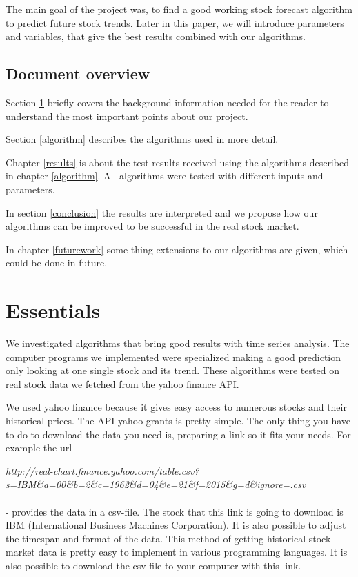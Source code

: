 \documentclass[conference]{IEEEtran}
\begin{document}
The main goal of the project was, to find a good working stock forecast algorithm to predict future stock trends. Later in this paper, we will introduce parameters and variables, that give the best results combined with our algorithms.

\subsection{Document overview}
Section \ref{essentials} briefly covers the background information needed for the reader to understand the most important points about our project.

Section \ref{algorithm} describes the algorithms used in more detail. 

Chapter \ref{results} is about the test-results received using the algorithms described in chapter \ref{algorithm}. All algorithms were tested with different inputs and parameters.

In section \ref{conclusion} the results are interpreted and we propose how our algorithms can be improved to be successful in the real stock market.

In chapter \ref{futurework} some thing extensions to our algorithms are given, which could be done in future.


\section{Essentials}
\label{essentials}

We investigated algorithms that bring good results with time series analysis. The computer programs we implemented were specialized  making a good prediction only looking at one single stock and its trend. These algorithms were tested on real stock data we fetched from the yahoo finance API. 

We used yahoo finance because it gives easy access to numerous stocks and their historical prices. The API yahoo grants is pretty simple. The only thing you have to do to download the data you need is, preparing a link so it fits your needs. For example the url -

\textit{\url{http://real-chart.finance.yahoo.com/table.csv?s=IBM&a=00&b=2&c=1962&d=04&e=21&f=2015&g=d&ignore=.csv}}
\\
\\
- provides the data in a csv-file. The stock that this link is going to download is IBM (International Business Machines Corporation). It is also possible to adjust the timespan and format of the data. 
This method of getting historical stock market data is pretty easy to implement in various programming languages. It is also possible to download the csv-file to your computer with this link.
\end{document}
